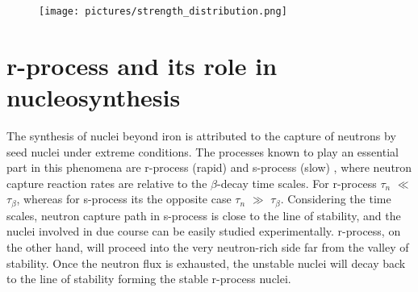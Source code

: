 \documentclass[a4paper,12pt,twoside]{report}
\begin{document}
 
 \begin{figure}[h]
\centering
\texttt{[image: pictures/strength\_distribution.png]}
\caption[]{ }
\label{fig:strength_distribution}
\end{figure}
 
 

\section{\textbf{r-process} and its role in nucleosynthesis}
The synthesis of nuclei beyond iron is attributed to the capture of neutrons by seed nuclei under extreme conditions. The processes known to play an essential part in this phenomena are r-process (rapid) and s-process (slow) \cite{burbridge}, where neutron capture reaction rates are relative to the $\beta$-decay time scales. For r-process $\tau_{n}$ $\ll$ $\tau_{\beta}$, whereas for s-process its the opposite case $\tau_{n}$ $\gg$ $\tau_{\beta}$. Considering the time scales, neutron capture path in s-process is close to the line of stability, and the nuclei involved in due course can be easily studied experimentally. r-process, on the other hand, will proceed into the very neutron-rich side far from the valley of stability. Once the neutron flux is exhausted, the unstable nuclei will decay back to the line of stability forming the stable r-process nuclei. 
\end{document}
